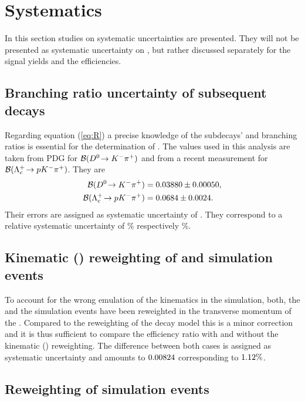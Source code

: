\chapter{Systematics}
\label{sec:Systematics}
In this section studies on systematic uncertainties are presented.
They will not be presented as systematic uncertainty on \R, but rather discussed separately for the signal yields and the efficiencies.

\section{Branching ratio uncertainty of subsequent decays}
Regarding equation (\ref{eq:R}) a precise knowledge of the subdecays' \DToKpi and \LcTopKpi branching ratios is essential for the determination of \R.
The values used in this analysis are taken from PDG \cite{PDG} for ${\cal B}({{D}^0}\!\rightarrow {\ensuremath{{K}^-}}{\ensuremath{{\pi}^+}})$ and from a recent \belle measurement \cite{Belle_BR_LcTopKpi} for ${\cal B}({{\Lambda}^+_{c}}\!\rightarrow {\ensuremath{p}}{\ensuremath{{K}^-}}{\ensuremath{{\pi}^+}})$.
They are
\begin{align*}
    {\ensuremath{\cal B}}({{D}^0}\!\rightarrow {\ensuremath{{K}^-}}{\ensuremath{{\pi}^+}}) &= 0.03880 \pm 0.00050, \\ 
    {\cal B}({{\Lambda}^+_{c}}\!\rightarrow {\ensuremath{p}}{\ensuremath{{K}^-}}{\ensuremath{{\pi}^+}}) &= 0.0684 \pm 0.0024.
\end{align*}
Their errors are assigned as systematic uncertainty of \R.
They correspond to a relative systematic uncertainty of \SystBRDToKpipercent\% respectively \SystBRLcTopKpipercent\%.

\section{Kinematic \pt(\Lb) reweighting of \LbToDpmunuX and \LbToLcmunu simulation events}
To account for the wrong emulation of the \Lb kinematics in the simulation, both, the \LbToDpmunuX and the \LbToLcmunu simulation events have been reweighted in the transverse momentum of the \Lb.
Compared to the reweighting of the \LbToDpmunuX decay model this is a minor correction and it is thus sufficient to compare the efficiency ratio \effRatio with and without the kinematic \pt(\Lb) reweighting.
The difference between both cases is assigned as systematic uncertainty and amounts to $0.00824$ corresponding to $1.12\%$.

\section{Reweighting of \LbToDpmunuX simulation events}
